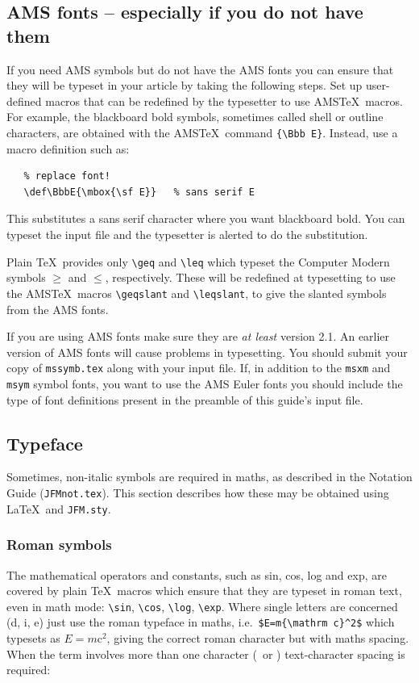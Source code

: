 \subsection{AMS fonts -- especially if you do not have them}

If you need AMS symbols but do not have the AMS fonts you can ensure that
they will be typeset in your article by taking the following steps. Set
up user-defined macros that can be redefined by the typesetter to use
AMS\TeX\ macros. For example, the blackboard bold symbols, sometimes
called shell or outline characters, are obtained with the AMS\TeX\ command
\verb"{\Bbb E}". Instead, use a macro definition such as:

\smallskip
\begin{verbatim}
   % replace font!
   \def\BbbE{\mbox{\sf E}}   % sans serif E
\end{verbatim}
\smallskip

\noindent This substitutes a sans serif character where you want blackboard bold.
You can typeset the input file and the typesetter is alerted to do the
substitution.

Plain \TeX\ provides only \verb"\geq" and \verb"\leq" which typeset the
Computer Modern symbols $\geq$ and $\leq$, respectively. These will be
redefined at typesetting to use the AMS\TeX\ macros \verb"\geqslant" and
\verb"\leqslant", to give the slanted symbols from the AMS fonts.

If you are using AMS fonts make sure they are {\em at least} version 2.1.
An earlier version of AMS fonts will cause problems in typesetting. You
should submit your copy of \verb"mssymb.tex" along with your input file.
If, in addition to the \verb"msxm" and \verb"msym" symbol fonts, you want
to use the AMS Euler fonts you should include the type of font definitions
present in the preamble of this guide's input file.

\subsection{Typeface}

Sometimes, non-italic symbols are required in maths, as described in the
Notation Guide (\verb"JFMnot.tex"). This section describes how these may be obtained using \LaTeX\ and \verb"JFM.sty".

\subsubsection{Roman symbols}\label{roman}
The mathematical operators and constants, such as sin, cos, log and exp,
are covered by plain \TeX\ macros which ensure that they are typeset in
roman text, even in math mode: \verb"\sin", \verb"\cos", \verb"\log",
\verb"\exp". Where single letters are concerned (\eg d, i, e) just use
the roman typeface in maths, i.e.\ \verb"$E=m{\mathrm c}^2$" which typesets as
$E=m{\mathrm c}^2$, giving the correct roman character but with maths spacing.
When the term involves more than one character (\eg \Real\ or \Imag )
text-character spacing is required:

